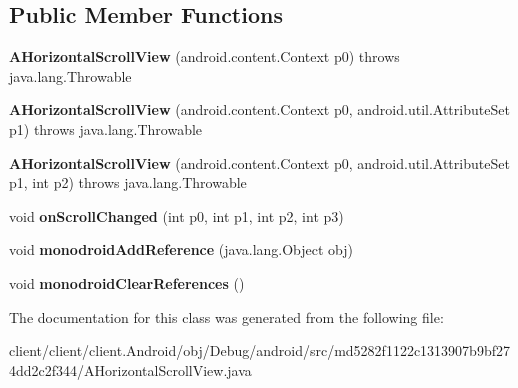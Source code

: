 \subsection*{Public Member Functions}
\begin{DoxyCompactItemize}
\item 
\hypertarget{classmd5282f1122c1313907b9bf274dd2c2f344_1_1AHorizontalScrollView_a4fc5ea02a9c6ca96df22c538d922b8db}{}{\bfseries A\+Horizontal\+Scroll\+View} (android.\+content.\+Context p0)  throws java.\+lang.\+Throwable 	\label{classmd5282f1122c1313907b9bf274dd2c2f344_1_1AHorizontalScrollView_a4fc5ea02a9c6ca96df22c538d922b8db}

\item 
\hypertarget{classmd5282f1122c1313907b9bf274dd2c2f344_1_1AHorizontalScrollView_ae60acb7e523cf173eac295ede8b1d64a}{}{\bfseries A\+Horizontal\+Scroll\+View} (android.\+content.\+Context p0, android.\+util.\+Attribute\+Set p1)  throws java.\+lang.\+Throwable 	\label{classmd5282f1122c1313907b9bf274dd2c2f344_1_1AHorizontalScrollView_ae60acb7e523cf173eac295ede8b1d64a}

\item 
\hypertarget{classmd5282f1122c1313907b9bf274dd2c2f344_1_1AHorizontalScrollView_a4cdb732483d119ccd26755834015ee04}{}{\bfseries A\+Horizontal\+Scroll\+View} (android.\+content.\+Context p0, android.\+util.\+Attribute\+Set p1, int p2)  throws java.\+lang.\+Throwable 	\label{classmd5282f1122c1313907b9bf274dd2c2f344_1_1AHorizontalScrollView_a4cdb732483d119ccd26755834015ee04}

\item 
\hypertarget{classmd5282f1122c1313907b9bf274dd2c2f344_1_1AHorizontalScrollView_a5dbbe119dd801ea23ca7b13c3026a6be}{}void {\bfseries on\+Scroll\+Changed} (int p0, int p1, int p2, int p3)\label{classmd5282f1122c1313907b9bf274dd2c2f344_1_1AHorizontalScrollView_a5dbbe119dd801ea23ca7b13c3026a6be}

\item 
\hypertarget{classmd5282f1122c1313907b9bf274dd2c2f344_1_1AHorizontalScrollView_aa0311ffb2d7402621b97e14888e2951f}{}void {\bfseries monodroid\+Add\+Reference} (java.\+lang.\+Object obj)\label{classmd5282f1122c1313907b9bf274dd2c2f344_1_1AHorizontalScrollView_aa0311ffb2d7402621b97e14888e2951f}

\item 
\hypertarget{classmd5282f1122c1313907b9bf274dd2c2f344_1_1AHorizontalScrollView_acfadafce7f0211b4af49b0cd18948644}{}void {\bfseries monodroid\+Clear\+References} ()\label{classmd5282f1122c1313907b9bf274dd2c2f344_1_1AHorizontalScrollView_acfadafce7f0211b4af49b0cd18948644}

\end{DoxyCompactItemize}


The documentation for this class was generated from the following file\+:\begin{DoxyCompactItemize}
\item 
client/client/client.\+Android/obj/\+Debug/android/src/md5282f1122c1313907b9bf274dd2c2f344/A\+Horizontal\+Scroll\+View.\+java\end{DoxyCompactItemize}
